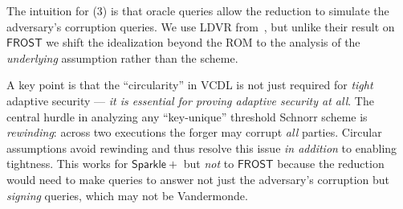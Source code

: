 
The intuition for (3) is that oracle queries allow the reduction to simulate the adversary’s 
corruption queries. We use LDVR from~\cite{C:KKTZ25}, but unlike their result on 
$\mathsf{FROST}$ we shift the idealization beyond the ROM to the analysis of the 
\emph{underlying} assumption rather than the scheme.

A key point is that the ``circularity'' in VCDL is not just required for \emph{tight} adaptive 
security --- \emph{it is essential for proving adaptive security at all}. The central hurdle in analyzing 
any ``key-unique'' threshold Schnorr scheme is \emph{rewinding}: across two executions the 
forger may corrupt \emph{all} parties. Circular assumptions avoid rewinding and thus resolve 
this issue \emph{in addition} to enabling tightness. This works for $\mathsf{Sparkle+}$ 
but \emph{not} to $\mathsf{FROST}$ because the reduction would need to make queries to answer not just the adversary's
corruption but \emph{signing} queries, which may not be Vandermonde. %

